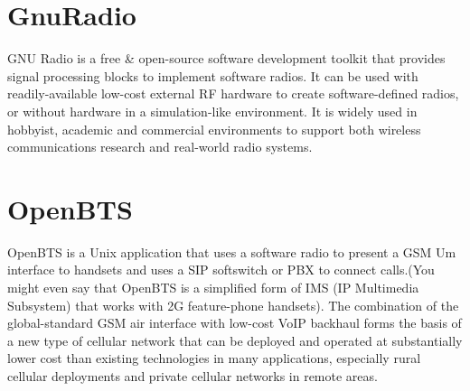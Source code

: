 \section{GnuRadio}
GNU Radio is a free & open-source software development toolkit that provides signal processing blocks to implement software radios. It can be used with readily-available low-cost external RF hardware to create software-defined radios, or without hardware in a simulation-like environment. It is widely used in hobbyist, academic and commercial environments to support both wireless communications research and real-world radio systems.

\section{OpenBTS}
OpenBTS is a Unix application that uses a software radio to present a GSM Um interface to handsets and uses a SIP softswitch or PBX to connect calls.(You might even say that OpenBTS is a simplified form of IMS (IP Multimedia Subsystem) that works with 2G feature-phone handsets). The combination of the global-standard GSM air interface with low-cost VoIP backhaul forms the basis of a new type of cellular network that can be deployed and operated at substantially lower cost than existing technologies in many applications, especially rural cellular deployments and private cellular networks in remote areas. 
